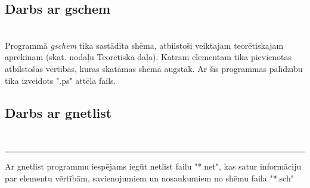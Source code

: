 \documentclass {report}
\begin{document}
\subsection{Darbs ar gschem}
\\
\indent Programmā \textit{gschem} tika sastādīta shēma, atbilstoši veiktajam teorētiskajam aprēķinam (skat. nodaļu Teorētiskā daļa). Katram elementam tika pievienotas atbilstošās vērtības, kuras skatāmas shēmā augstāk. Ar šīs programmas palīdzību tika izveidots ".ps" attēla fails.
\subsection{Darbs ar gnetlist}
 \\
\hrule
\relax
\indent Ar gnetlist programmu iespējams iegūt netlist failu "*.net", kas satur informāciju par elementu vērtībām, savienojumiem un nosaukumiem no shēmu faila "*.sch"
\end{document}
